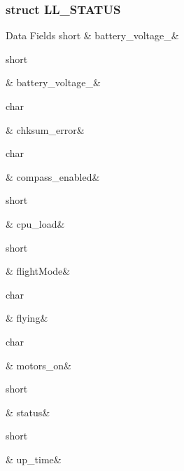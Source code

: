 \label{df/d98/a00107}
\hypertarget{a00004_df/d98/a00107}{}
\subsubsection{struct L\-L\-\_\-\-S\-T\-A\-T\-U\-S}
\begin{DoxyFields}{Data Fields}
\hypertarget{a00004_a459f77aee98b6bebbd3c2d54f2ab6667}{short}\label{a00004_a459f77aee98b6bebbd3c2d54f2ab6667}
&
battery\-\_\-voltage\-\_&
\\
\hline

\hypertarget{a00004_a5e4eeb8bd1ab20465f6008fbebbbedce}{short}\label{a00004_a5e4eeb8bd1ab20465f6008fbebbbedce}
&
battery\-\_\-voltage\-\_&
\\
\hline

\hypertarget{a00004_aac75399e9f68d442064c7d78f5f2fa73}{char}\label{a00004_aac75399e9f68d442064c7d78f5f2fa73}
&
chksum\-\_\-error&
\\
\hline

\hypertarget{a00004_ad1d096bb5ed60c0f259c3adca79c103f}{char}\label{a00004_ad1d096bb5ed60c0f259c3adca79c103f}
&
compass\-\_\-enabled&
\\
\hline

\hypertarget{a00004_adb812fe651007f02ed6d18ddad64d29b}{short}\label{a00004_adb812fe651007f02ed6d18ddad64d29b}
&
cpu\-\_\-load&
\\
\hline

\hypertarget{a00004_a3a9b579ed098eba7a5107adb32a9375a}{short}\label{a00004_a3a9b579ed098eba7a5107adb32a9375a}
&
flight\-Mode&
\\
\hline

\hypertarget{a00004_af2fb6251c4d6d896f8b035e3b0f20f62}{char}\label{a00004_af2fb6251c4d6d896f8b035e3b0f20f62}
&
flying&
\\
\hline

\hypertarget{a00004_aab9b23de5d0dbb9425a558ca5ffff3df}{char}\label{a00004_aab9b23de5d0dbb9425a558ca5ffff3df}
&
motors\-\_\-on&
\\
\hline

\hypertarget{a00004_aab78832eca253df36aafa204d68e4bac}{short}\label{a00004_aab78832eca253df36aafa204d68e4bac}
&
status&
\\
\hline

\hypertarget{a00004_aaee9038f6196d496f2539741c95e0f9b}{short}\label{a00004_aaee9038f6196d496f2539741c95e0f9b}
&
up\-\_\-time&
\\
\hline

\end{DoxyFields}
\label{d1/dd6/a00108}
\hypertarget{a00004_d1/dd6/a00108}{}
